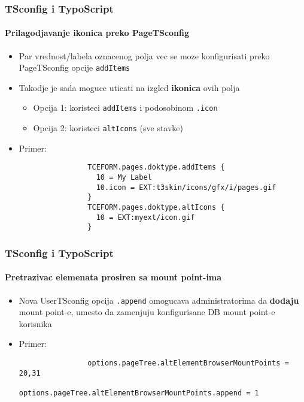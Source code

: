 \begin{frame}[fragile]
	\frametitle{TSconfig i TypoScript}
	\framesubtitle{Prilagodjavanje ikonica preko PageTSconfig}

	\begin{itemize}
		\item Par vrednost/labela oznacenog polja vec se moze konfigurisati preko PageTSconfig opcije \texttt{addItems}
		\item Takodje je sada moguce uticati na izgled \textbf{ikonica} ovih polja 

			\begin{itemize}
				\item Opcija 1: koristeci \texttt{addItems} i podosobinom \texttt{.icon}
				\item Opcija 2: koristeci \texttt{altIcons} (sve stavke)
			\end{itemize}

		\item Primer:

			\begin{lstlisting}
				TCEFORM.pages.doktype.addItems {
				  10 = My Label
				  10.icon = EXT:t3skin/icons/gfx/i/pages.gif
				}
				TCEFORM.pages.doktype.altIcons {
				  10 = EXT:myext/icon.gif
				}
			\end{lstlisting}

	\end{itemize}

\end{frame}


\begin{frame}[fragile]
	\frametitle{TSconfig i TypoScript}
	\framesubtitle{Pretrazivac elemenata prosiren sa mount point-ima}

	\begin{itemize}
		\item Nova UserTSconfig opcija \texttt{.append} omogucava administratorima da \textbf{dodaju}
			mount point-e, umesto da zamenjuju konfigurisane DB mount point-e korisnika

		\item Primer:

			\begin{lstlisting}
				options.pageTree.altElementBrowserMountPoints = 20,31
				options.pageTree.altElementBrowserMountPoints.append = 1
			\end{lstlisting}

	\end{itemize}

\end{frame}

